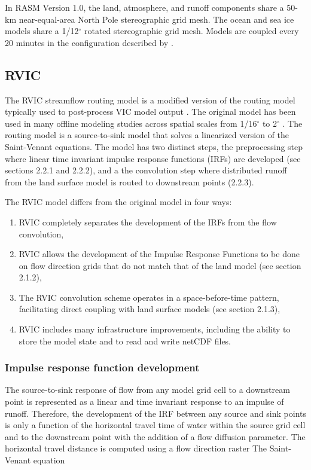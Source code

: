 \documentclass[ms, draft]{agutex}
\begin{document}
\begin{article}
In RASM Version 1.0, the land, atmosphere, and runoff components share a 50-km near-equal-area North Pole stereographic grid mesh.
The ocean and sea ice models share a 1/12$^{\circ}$ rotated stereographic grid mesh.
Models are coupled every 20 minutes in the configuration described by \citet{Roberts_2015a}.

\subsection{RVIC}

The RVIC streamflow routing model is a modified version of the routing model typically used to post-process VIC model output \citep{Lohmann_1996, Lohmann_1998a}.
The original \citet{Lohmann_1996} model has been used in many offline modeling studies across spatial scales from 1/16$^{\circ}$ to 2$^{\circ}$ \citep[.e.g.][]{Nijssen_1997,Lohmann_1998b,Su_2005}.
The routing model is a source-to-sink model that solves a linearized version of the Saint-Venant equations.
The model has two distinct steps, the preprocessing step where linear time invariant impulse response functions (IRFs) are developed (see sections 2.2.1 and 2.2.2), and a the convolution step where distributed runoff from the land surface model is routed to downstream points (2.2.3).

The RVIC model differs from the original \citet{Lohmann_1996} model in four ways:

\begin{enumerate}
\item RVIC completely separates the development of the IRFs from the flow convolution,
\item RVIC allows the development of the Impulse Response Functions to be done on flow direction grids that do not match that of the land model (see section 2.1.2),
\item The RVIC convolution scheme operates in a space-before-time pattern, facilitating direct coupling with land surface models (see section 2.1.3),
\item RVIC includes many infrastructure improvements, including the ability to store the model state and to read and write netCDF files.
\end{enumerate}

\subsubsection{Impulse response function development}

The source-to-sink response of flow from any model grid cell to a downstream point is represented as a linear and time invariant response to an impulse of runoff.
Therefore, the development of the IRF between any source and sink points is only a function of the horizontal travel time of water within the source grid cell and to the downstream point with the addition of a flow diffusion parameter.
The horizontal travel distance is computed using a flow direction raster \citep[e.g.][]{Wu_2011}
The Saint-Venant equation


\end{article}
\end{document}
